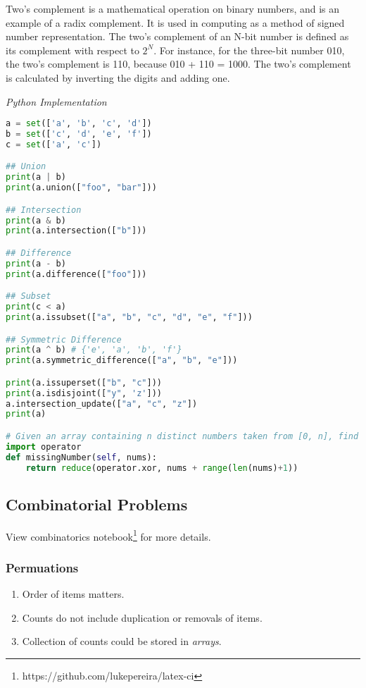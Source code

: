 \documentclass{article}
\begin{document}
    Two's complement is a mathematical operation on binary numbers, and is an example of a radix complement. It is used in computing as a method of signed number representation. The two's complement of an N-bit number is defined as its complement with respect to $2^N$. For instance, for the three-bit number 010, the two's complement is 110, because 010 + 110 = 1000. The two's complement is calculated by inverting the digits and adding one.

\vspace{8pt} \emph{Python Implementation}
\begin{lstlisting}[language=Python]
a = set(['a', 'b', 'c', 'd'])
b = set(['c', 'd', 'e', 'f'])
c = set(['a', 'c'])

## Union
print(a | b)
print(a.union(["foo", "bar"]))

## Intersection
print(a & b)
print(a.intersection(["b"]))

## Difference
print(a - b)
print(a.difference(["foo"]))

## Subset
print(c < a)
print(a.issubset(["a", "b", "c", "d", "e", "f"]))

## Symmetric Difference
print(a ^ b) # {'e', 'a', 'b', 'f'}
print(a.symmetric_difference(["a", "b", "e"]))

print(a.issuperset(["b", "c"]))
print(a.isdisjoint(["y", 'z']))
a.intersection_update(["a", "c", "z"])
print(a)

# Given an array containing n distinct numbers taken from [0, n], find the one that is missing from the array.
import operator
def missingNumber(self, nums):
    return reduce(operator.xor, nums + range(len(nums)+1))
\end{lstlisting}    

\subsection{Combinatorial Problems}

    View combinatorics notebook\footnote{https://github.com/lukepereira/latex-ci} for more details.

    \subsubsection{Permuations}
    \begin{enumerate}
        \item Order of items matters.
        \item Counts do not include duplication or removals of items.
        \item Collection of counts could be stored in \emph{arrays}. 
    \end{enumerate} 
    
\end{document}
